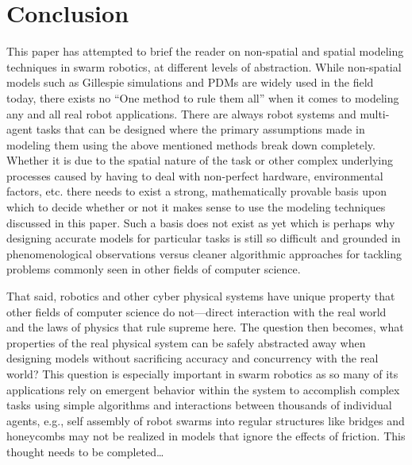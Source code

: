 \documentclass[Main.tex]{subfiles}
\begin{document}
\section{Conclusion}
This paper has attempted to brief the reader on non-spatial and spatial modeling techniques in swarm robotics, at different levels of abstraction. While non-spatial models such as Gillespie simulations and PDMs are widely used in the field today, there exists no ``One method to rule them all'' when it comes to modeling any and all real robot applications. There are always robot systems and multi-agent tasks that can be designed where the primary assumptions made in modeling them using the above mentioned methods break down completely. Whether it is due to the spatial nature of the task or other complex underlying processes caused by having to deal with non-perfect hardware, environmental factors, etc. there needs to exist a strong, mathematically provable basis upon which to decide whether or not it makes sense to use the modeling techniques discussed in this paper. Such a basis does not exist as yet which is perhaps why designing accurate models for particular tasks is still so difficult and grounded in phenomenological observations versus cleaner algorithmic approaches for tackling problems commonly seen in other fields of computer science.

That said, robotics and other cyber physical systems have unique property that other fields of computer science do not---direct interaction with the real world and the laws of physics that rule supreme here. The question then becomes, what properties of the real physical system can be safely abstracted away when designing models without sacrificing accuracy and concurrency with the real world? This question is especially important in swarm robotics as so many of its applications rely on emergent behavior within the system to accomplish complex tasks using simple algorithms and interactions between thousands of individual agents\cite{Hamann2012}, e.g., self assembly of robot swarms into regular structures like bridges and honeycombs may not be realized in models that ignore the effects of friction. This thought needs to be completed\ldots
\end{document}
